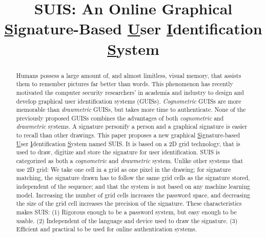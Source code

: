 \documentclass[conference]{IEEEtran}
\begin{document}
\sloppy
\title{SUIS: An Online Graphical \underline{S}ignature-Based \underline{U}ser \underline{I}dentification \underline{S}ystem}


\author{
}











\maketitle

\begin{abstract}
Humans possess a large amount of, and almost limitless, visual memory, that assists them to remember pictures far better than words. This phenomenon has recently motivated the computer security researchers' in academia and industry to design and develop graphical user identification systems (GUISs). \emph{Cognometric} GUISs are more memorable than \emph{drawmetric} GUISs, but takes more time to authenticate. None of the previously proposed GUISs combines the advantages of both \emph{cognometric} and \emph{drawmetric} systems. A signature personify a person and a graphical signature is easier to recall than other drawings. This paper proposes a new graphical \underline{S}ignature-based \underline{U}ser \underline{I}dentification \underline{S}ystem named SUIS. It is based on a 2D grid technology, that is used to draw, digitize and store the signature for user identification. SUIS is categorized as both a \emph{cognometric} and \emph{drawmetric} system. Unlike other systems that use 2D grid: We take one cell in a grid as one pixel in the drawing; for signature matching, the signature drawn has to follow the same grid cells as the signature stored, independent of the sequence; and that the system is not based on any machine learning model. Increasing the number of grid cells increases the password space, and decreasing the size of the grid cell increases the precision of the signature. These characteristics makes SUIS: (1) Rigorous enough to be a password system, but easy enough to be usable. (2) Independent of the language and device used to draw the signature. (3) Efficient and practical to be used for online authentication systems.
\end{abstract}
\end{document}
